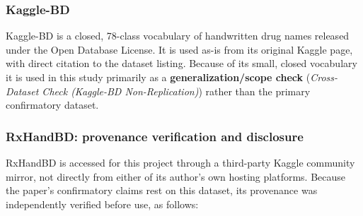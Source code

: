 \documentclass[fleqn,10pt]{wlpeerj}
\begin{document}
\subsubsection*{Kaggle-BD}\label{sec:kaggle-bd}

Kaggle-BD is a closed, 78-class vocabulary of handwritten drug names released under the Open Database License. It is used as-is from its original Kaggle page, with direct citation to the dataset listing. Because of its small, closed vocabulary it is used in this study primarily as a \textbf{generalization/scope check} (\textit{Cross-Dataset Check (Kaggle-BD Non-Replication)}) rather than the primary confirmatory dataset.

\subsubsection*{RxHandBD: provenance verification and disclosure}\label{sec:rxhandbd-provenance}

RxHandBD is accessed for this project through a third-party Kaggle community mirror, not directly from either of its author's own hosting platforms. Because the paper's confirmatory claims rest on this dataset, its provenance was independently verified before use, as follows:
\end{document}

